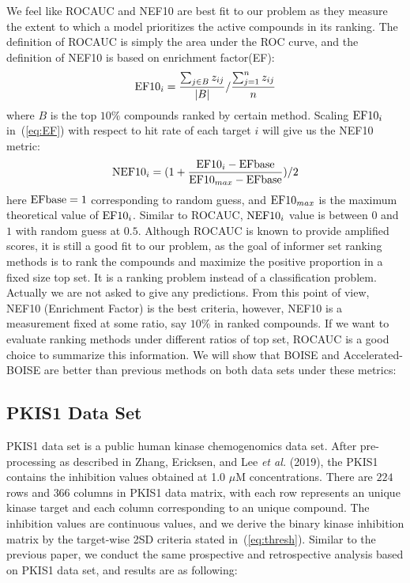 \documentclass[12pt]{article}
\begin{document}
We feel like ROCAUC and NEF10 are best fit to our problem as they measure the extent to which a model prioritizes the active compounds in its ranking. The definition of ROCAUC is simply the area under the ROC curve, and the definition of NEF10 is based on enrichment factor(EF):
\begin{eqnarray}
\label{eq:EF}
{\rm EF10}_i = \frac{\sum_{j\in B}z_{ij}}{|B|}/\frac{\sum_{j=1}^nz_{ij}}{n}
\end{eqnarray}
where $B$ is the top $10\%$ compounds ranked by certain method. Scaling ${\rm EF10}_i$ in~(\ref{eq:EF}) with respect to hit rate of each target $i$ will give us the NEF10 metric:
\begin{eqnarray}
\label{eq:NEF}
{\rm NEF10}_i = (1+\frac{{\rm EF10}_i - {\rm EFbase}}{{\rm EF10}_{max} -{\rm EFbase} })/2
\end{eqnarray}
here ${\rm EFbase} = 1$ corresponding to random guess, and ${\rm EF10}_{max}$ is the maximum theoretical value of ${\rm EF10}_i$. Similar to ROCAUC, ${\rm NEF10}_i$ value is between $0$ and $1$ with random guess at $0.5$. 
Although ROCAUC is known to provide amplified scores, it is still a good fit to our problem, as the goal of informer set ranking methods is to rank the compounds and maximize the positive proportion in a fixed size top set. It is a ranking problem instead of a classification problem. Actually we are not asked to give any predictions. From this point of view, NEF10 (Enrichment Factor) is the best criteria, however, NEF10 is a measurement fixed at some ratio, say $10\%$ in ranked compounds. If we want to evaluate ranking methods under different ratios of top set, ROCAUC is a good choice to summarize this information. We will show that BOISE and Accelerated-BOISE are better than previous methods on both data sets under these metrics:

\subsection{PKIS1 Data Set}
PKIS1 data set is a public human kinase chemogenomics data set. After pre-processing as described in Zhang, Ericksen, and Lee {\em et al.} (2019), the PKIS1 contains the inhibition values obtained at 1.0 $\mu$M concentrations. There are $224$ rows and $366$ columns in PKIS1 data matrix, with each row represents an unique kinase target and each column corresponding to an unique compound. The inhibition values are continuous values, and we derive the binary kinase inhibition matrix by the target-wise 2SD criteria stated in~(\ref{eq:thresh}). Similar to the previous paper, we conduct the same prospective and retrospective analysis based on PKIS1 data set, and results are as following:
\end{document}
